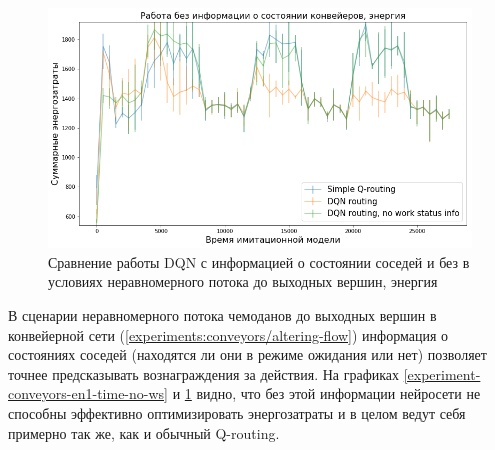 \documentclass[specification, annotation]{itmo-student-thesis}
\begin{document}
\begin{figure}[!h]
  \caption{Сравнение работы DQN с информацией о состоянии соседей и без в
    условиях неравномерного потока до выходных вершин, энергия}\label{experiment-conveyors-en1-energy-no-ws}
  \centering
  \includegraphics[scale=0.6]{experiment-conveyors-en1-energy-no-ws}
\end{figure}

В сценарии неравномерного потока чемоданов до выходных вершин в конвейерной сети
(\ref{experiments:conveyors/altering-flow})
информация о состояниях соседей (находятся ли они в режиме ожидания или нет)
позволяет точнее предсказывать вознаграждения за действия. На графиках
\ref{experiment-conveyors-en1-time-no-ws} и
\ref{experiment-conveyors-en1-energy-no-ws} видно, что без этой информации
нейросети не способны эффективно оптимизировать энергозатраты и в целом ведут
себя примерно так же, как и обычный Q-routing.
\end{document}
